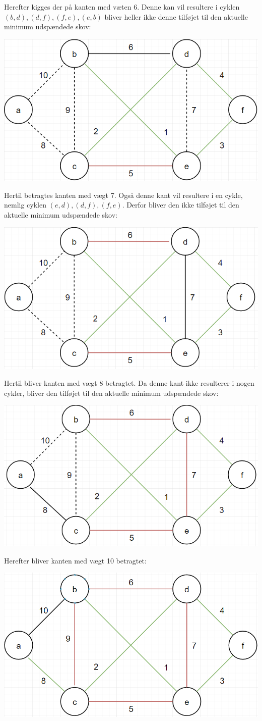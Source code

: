 \documentclass{report}
\begin{document}
Herefter kigges der på kanten med væten 6. Denne kan vil resultere i cyklen $(b, d), (d, f), (f, e), (e, b)$ bliver heller ikke denne tilføjet til den aktuelle minimum udspændede skov:
\begin{center}
    \includegraphics[height = 5 cm]{../entities/kruskal6}
\end{center}
Hertil betragtes kanten med vægt 7. Også denne kant vil resultere i en cykle, nemlig cyklen $(e, d), (d, f), (f, e)$. Derfor bliver den ikke tilføjet til den aktuelle minimum udspændede skov:
\begin{center}
    \includegraphics[height = 5 cm]{../entities/kruskal7}
\end{center}
Hertil bliver kanten med vægt 8 betragtet. Da denne kant ikke resulterer i nogen cykler, bliver den tilføjet til den aktuelle minimum udspændede skov:
\begin{center}
    \includegraphics[height = 5 cm]{../entities/kruskal8}
\end{center}
Herefter bliver kanten med vægt 10 betragtet:
\begin{center}
    \includegraphics[height = 5 cm]{../entities/kruskal10}
\end{center}
\end{document}
